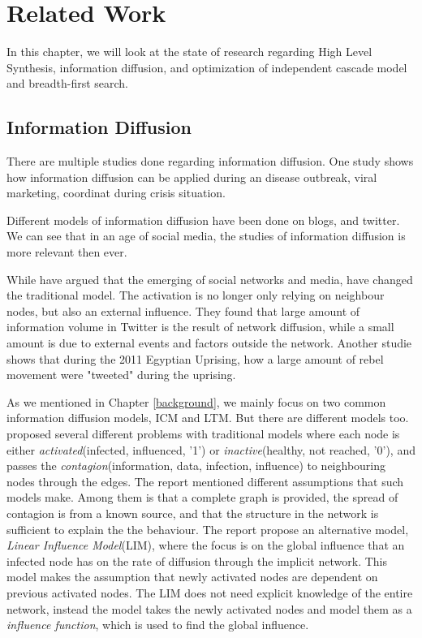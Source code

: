 \chapter{Related Work}  \label{relatedWork}


In this chapter, we will look at the state of research regarding High Level Synthesis, information diffusion, and optimization of independent cascade model and  breadth-first search.

\section{Information Diffusion} 
There are multiple studies done regarding information diffusion. One study shows how information diffusion can be applied during an disease outbreak\cite{InformationDiffusionThroughBlogspace}, viral marketing\cite{ViralMarketing}, coordinat during crisis situation\cite{Starbird:2012:RRI:2145204.2145212}. 

Different models of information diffusion have been done on blogs\citep{Adar:2005:TIE:1092358.1092473}\cite{GomezRodriguez:2010:IND:1835804.1835933}, and twitter\cite{Bakshy:2011:EIQ:1935826.1935845}. We can see that in an age of social media, the studies of information diffusion is more relevant then ever. 

While \cite{InfoDiffAndExternalInfluInNetworks} have argued that the emerging of social networks and media, have changed the traditional model. The activation is no longer only relying on neighbour nodes, but also an external influence. They found that large amount of information volume in Twitter is the result of network diffusion, while a small amount is due to external events and factors outside the network\citep{InfoDiffAndExternalInfluInNetworks}. Another studie shows that during the 2011 Egyptian Uprising, how a large amount of rebel movement were "tweeted"\cite{Starbird:2012:RRI:2145204.2145212} during the uprising.

As we mentioned in Chapter \ref{background}, we mainly focus on two common information diffusion models, ICM and LTM. But there are different models too. \cite{5694014} proposed several different problems with traditional models where each node is either \textit{activated}(infected, influenced, '1') or \textit{inactive}(healthy, not reached, '0'), and passes the \textit{contagion}(information, data, infection, influence) to neighbouring nodes through the edges. The report mentioned different assumptions that such models make. Among them is that a complete graph is provided, the spread of contagion is from a known source, and that the structure in the network is sufficient to explain the the behaviour\citep{5694014}. The report propose an alternative model, \textit{Linear Influence Model}(LIM), where the focus is on the global influence that an infected node has on the rate of diffusion through the implicit network. This model makes the  assumption that newly activated nodes are dependent on previous activated nodes. The LIM does not need explicit knowledge of the entire network, instead the model takes the newly activated nodes and model them as a \textit{influence function}, which is used to find the global influence. 	

